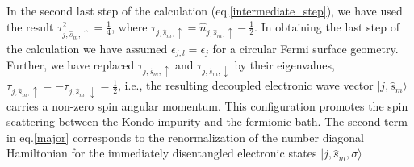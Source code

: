 \documentclass[aps,prb,preprint,groupedaddress]{revtex4-2}
\begin{document}
In the second last step of the calculation (eq.\eqref{intermediate_step}), we have used the result $\tau_{j,\hat{s}_{m},\uparrow}^{2}=\frac{1}{4}$, where $\tau_{j,\hat{s}_{m},\uparrow}=\hat{n}_{j,\hat{s}_{m},\uparrow}-\frac{1}{2}$. In obtaining the last step of the calculation we have assumed $\epsilon_{j,l}=\epsilon_{j}$ for a circular Fermi surface geometry. Further, we have replaced $\tau_{j,\hat{s}_{m},\uparrow}$ and $\tau_{j,\hat{s}_{m},\downarrow}$ by their eigenvalues, $\tau_{j,\hat{s}_{m},\uparrow}=-\tau_{j,\hat{s}_{m},\downarrow}=\frac{1}{2}$, i.e., the resulting decoupled electronic wave vector $|j,\hat{s}_{m}\rangle$ carries a non-zero spin angular momentum. This configuration promotes the spin scattering between the Kondo impurity and the fermionic bath.
\pin
The second term in eq.\eqref{major} corresponds to the renormalization of the number diagonal Hamiltonian for the immediately disentangled electronic states $|j,\hat{s}_{m},\sigma\rangle$
\end{document}
